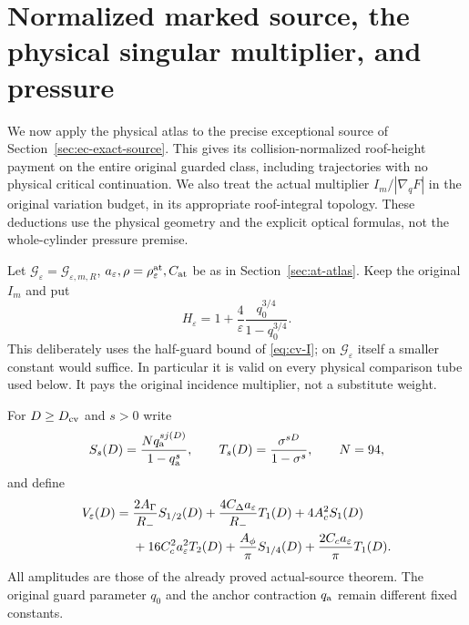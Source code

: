 \section{Normalized marked source, the physical singular multiplier, and pressure}
\label{sec:nh-normalized}
We now apply the physical atlas to the precise exceptional source
of Section~\ref{sec:ec-exact-source}.  This gives its
collision-normalized roof-height payment on the entire original
guarded class, including trajectories with no physical critical
continuation.  We also treat the actual multiplier
$I_m/|\nabla_qF|$ in the original variation budget, in its
appropriate roof-integral topology.  These deductions use the
physical geometry and the explicit optical formulas, not the
whole-cylinder pressure premise.

Let $\mathcal G_\varepsilon=\mathcal G_{\varepsilon,m,R}$,
$a_\varepsilon,\rho=\rho_\varepsilon^{\rm at},C_{\rm at}$ be
as in Section~\ref{sec:at-atlas}.  Keep the original $I_m$ and put
\begin{equation}\label{eq:nh-incidence}
 H_\varepsilon=1+\frac4\varepsilon
                  \frac{q_0^{3/4}}{1-q_0^{3/4}}.
\end{equation}
This deliberately uses the half-guard bound of
\eqref{eq:cv-I}; on $\mathcal G_\varepsilon$ itself a smaller
constant would suffice.  In particular it is valid on every
physical comparison tube used below.  It pays the original
incidence multiplier, not a substitute weight.

For $D\ge D_{\rm cv}$ and $s>0$ write
\begin{equation}\label{eq:nh-series}
 S_s(D)=\frac{Nq_{\rm a}^{s j(D)}}{1-q_{\rm a}^s},\qquad
 T_s(D)=\frac{\sigma^{sD}}{1-\sigma^s},\qquad N=94,
\end{equation}
and define
\begin{align}\label{eq:nh-budget}
 V_\varepsilon(D)={}&
 \frac{2A_\Gamma}{R_-}S_{1/2}(D)
 +\frac{4C_\Delta a_\varepsilon}{R_-}T_1(D)
 +4A_c^2 S_1(D)\notag\\
 &+16C_c^2a_\varepsilon^2 T_2(D)
 +\frac{A_\phi}{\pi}S_{1/4}(D)
 +\frac{2C_c a_\varepsilon}{\pi}T_1(D).
\end{align}
All amplitudes are those of the already proved actual-source
theorem.  The original guard parameter $q_0$ and the anchor
contraction $q_{\rm a}$ remain different fixed constants.

